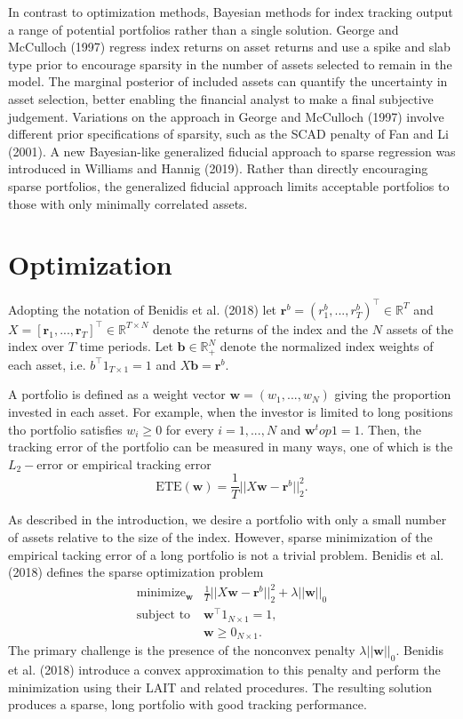 \documentclass[a4paper, 12pt]{article}
\theoremstyle{plain}
\theoremstyle{definition}
\theoremstyle{remark}
\begin{document}
In contrast to optimization methods, Bayesian methods for index tracking output a range of potential portfolios rather than a single solution.  George and McCulloch (1997) regress index returns on asset returns and use a spike and slab type prior to encourage sparsity in the number of assets selected to remain in the model.  The marginal posterior of included assets can quantify the uncertainty in asset selection, better enabling the financial analyst to make a final subjective judgement.  Variations on the approach in George and McCulloch (1997) involve different prior specifications of sparsity, such as the SCAD penalty of Fan and Li (2001).  A new Bayesian-like generalized fiducial approach to sparse regression was introduced in Williams and Hannig (2019).  Rather than directly encouraging sparse portfolios, the generalized fiducial approach limits acceptable portfolios to those with only minimally correlated assets.  
       

\section*{Optimization}

Adopting the notation of Benidis et al. (2018) let $\textbf{r}^b = (r_1^b,...,r_T^b)^\top \in \mathbb{R}^T$ and $X = [\textbf{r}_1,...,\textbf{r}_T]^\top \in \mathbb{R}^{T\times N}$ denote the returns of the index and the $N$ assets of the index over $T$ time periods.  Let $\textbf{b}\in\mathbb{R}_+^N$ denote the normalized index weights of each asset, i.e. $b^\top 1_{T\times 1} = 1$ and $X\textbf{b} = \textbf{r}^b$.  

A portfolio is defined as a weight vector $\textbf{w} = (w_1, ..., w_N)$ giving the proportion invested in each asset.  For example, when the investor is limited to long positions tho portfolio satisfies $w_i \geq 0$ for every $i = 1, ..., N$ and $\textbf{w}^top 1 = 1$.  Then, the tracking error of the portfolio can be measured in many ways, one of which is the $L_2-$error or empirical tracking error
\[\text{ETE}(\textbf{w})=\frac{1}{T}||X\textbf{w}-\textbf{r}^b||_2^2.\]

As described in the introduction, we desire a portfolio with only a small number of assets relative to the size of the index.  However, sparse minimization of the empirical tacking error of a long portfolio is not a trivial problem. Benidis et al. (2018) defines the sparse optimization problem
\begin{align}
\text{minimize}_{\textbf{w}}& \frac{1}{T}||X\textbf{w}-\textbf{r}^b||_2^2 + \lambda||\textbf{w}||_0\nonumber\\
\text{subject to}& \textbf{w}^\top 1_{N\times 1}=1, \nonumber \\
 & \textbf{w}\geq 0_{N\times 1}.
\end{align}  
The primary challenge is the presence of the nonconvex penalty $\lambda||\textbf{w}||_0$.  Benidis et al. (2018) introduce a convex approximation to this penalty and perform the minimization using their LAIT and related procedures.  The resulting solution produces a sparse, long portfolio with good tracking performance.
\end{document}
